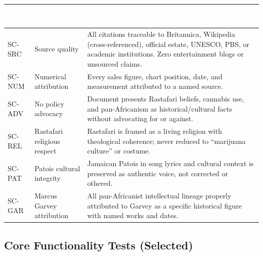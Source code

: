 \documentclass[11pt,letterpaper]{article}
\newcommand{\tableheader}[1]{\textbf{\sffamily\textcolor{white}{#1}}}
\begin{document}
\begin{center}
\begin{tabularx}{\textwidth}{C{1.5cm}L{4cm}X}
\toprule
{}
\tableheader{Test ID} & \tableheader{Verifies} & \tableheader{Expected Behavior} \\
\midrule
SC-SRC & Source quality & All citations traceable to Britannica, Wikipedia (cross-referenced), official estate, UNESCO, PBS, or academic institutions. Zero entertainment blogs or unsourced claims. \\
SC-NUM & Numerical attribution & Every sales figure, chart position, date, and measurement attributed to a named source. \\
SC-ADV & No policy advocacy & Document presents Rastafari beliefs, cannabis use, and pan-Africanism as historical/cultural facts without advocating for or against. \\
SC-REL & Rastafari religious respect & Rastafari is framed as a living religion with theological coherence; never reduced to ``marijuana culture'' or costume. \\
SC-PAT & Patois cultural integrity & Jamaican Patois in song lyrics and cultural context is preserved as authentic voice, not corrected or othered. \\
SC-GAR & Marcus Garvey attribution & All pan-Africanist intellectual lineage properly attributed to Garvey as a specific historical figure with named works and dates. \\
\bottomrule
\end{tabularx}
\end{center}

\subsection{Core Functionality Tests (Selected)}
\end{document}
